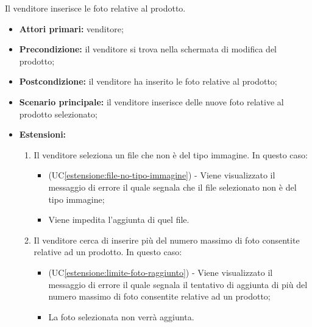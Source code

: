 \label{modifica-prodotto.aggiunta-foto}

Il venditore inserisce le foto relative al prodotto.
\begin{itemize}
    \item \textbf{Attori primari:} venditore;
    \item \textbf{Precondizione:} il venditore si trova nella schermata di modifica del prodotto;
    \item \textbf{Postcondizione:} il venditore ha inserito le foto relative al prodotto;
    \item \textbf{Scenario principale:} il venditore inserisce delle nuove foto relative al prodotto selezionato;
    \item \textbf{Estensioni:}
    \begin{enumerate}[label=\lett]
    	\item Il venditore seleziona un file che non è del tipo immagine. In questo caso:
		\begin{itemize}
			\item (UC\ref{estensione:file-no-tipo-immagine}) - Viene visualizzato il messaggio di errore il quale segnala che il file selezionato non è del tipo immagine;
			\item Viene impedita l'aggiunta di quel file.
		\end{itemize}
		\item Il venditore cerca di inserire più del numero massimo di foto consentite relative ad un prodotto. In questo caso:
		\begin{itemize}
			\item (UC\ref{estensione:limite-foto-raggiunto}) - Viene visualizzato il messaggio di errore il quale segnala il tentativo di aggiunta di più del numero massimo di foto consentite relative ad un prodotto;
			\item La foto selezionata non verrà aggiunta.
		\end{itemize}
    \end{enumerate}
\end{itemize}

\label{modifica-prodotto.rimozione-foto}

